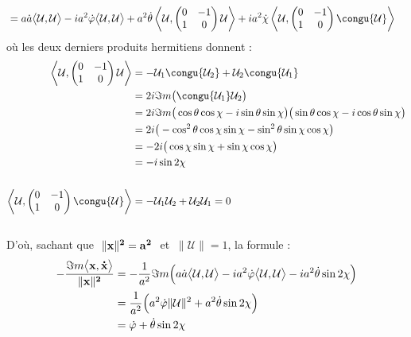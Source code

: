 \begin{demo}
\begin{align*}
			&= a\dot{a} \big\langle \mathcal{U}, \mathcal{U}\big\rangle  - ia^2\dot{\varphi} \big\langle \mathcal{U}, \mathcal{U}\big\rangle  + a^2\dot{\theta}\left\langle \mathcal{U}, \begin{pmatrix} 0 & -1 \\ 1 & 0 \end{pmatrix}\mathcal{U}\right\rangle + ia^2\dot{\chi}\left\langle \mathcal{U}, \begin{pmatrix} 0 & -1 \\ 1 & 0 \end{pmatrix}\congu{\mathcal{U}}\right\rangle
	\end{align*}
	où les deux derniers produits hermitiens donnent :
	\begin{align*}
		\left\langle \mathcal{U}, \begin{pmatrix} 0 & -1 \\ 1 & 0 \end{pmatrix}\mathcal{U}\right\rangle &= -\mathcal{U}_1\congu{\mathcal{U}_2} + \mathcal{U}_2\congu{\mathcal{U}_1} \\
		&= 2i\Im m\big(\congu{\mathcal{U}_1} \mathcal{U}_2\big) \\
		&= 2i\Im m\big(\cos\theta \cos\chi - i \sin\theta \sin\chi \big) \big( \sin\theta \cos\chi - i \cos\theta \sin\chi \big) \\
		&= 2i\big(-\cos^2\theta \cos\chi \sin\chi - \sin^2\theta \sin\chi \cos\chi \big) \\
		&= -2i\big( \cos\chi \sin\chi + \sin\chi \cos\chi \big) \\
		&= -i\sin2\chi 
		\\ \\
	\left\langle \mathcal{U}, \begin{pmatrix} 0 & -1 \\ 1 & 0 \end{pmatrix}\congu{\mathcal{U}}\right\rangle &= -\mathcal{U}_1\mathcal{U}_2 + \mathcal{U}_2\mathcal{U}_1 = 0
	\end{align*}
	\\
	D'où, sachant que $\ \|\bf{x}\|^2=a^2\ $ et $\ \|\mathcal{U}\|=1$, la formule :
	\begin{align*}
		-\frac{\Im m\big\langle \bf{x},\dot{\bf{x}}\big\rangle}{\|\bf{x}\|^2} &= -\frac{1}{a^2}\Im m\Big(a\dot{a} \big\langle \mathcal{U}, \mathcal{U}\big\rangle  - ia^2\dot{\varphi} \big\langle \mathcal{U}, \mathcal{U}\big\rangle - ia^2\dot{\theta} \sin2\chi \Big) \\
		&= \frac{1}{a^2} \Big( a^2\dot{\varphi} \|\mathcal{U}\|^2 + a^2\dot{\theta} \sin2\chi \Big) \\
		&= \dot{\varphi} + \dot{\theta} \sin2\chi
	\end{align*}
	\\
	

\end{demo}
